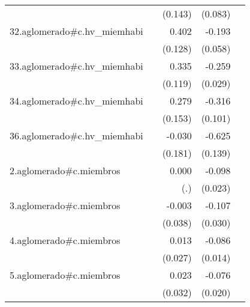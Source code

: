 {\begin{longtable}{l*{4}{D{.}{.}{-1}}}
            &                     &     (0.143)         &     (0.083)         &                     \\
\addlinespace
32.aglomerado#c.hv\_miemhabi&                     &       0.402\sym{**} &      -0.193\sym{***}&                     \\
            &                     &     (0.128)         &     (0.058)         &                     \\
\addlinespace
33.aglomerado#c.hv\_miemhabi&                     &       0.335\sym{**} &      -0.259\sym{***}&                     \\
            &                     &     (0.119)         &     (0.029)         &                     \\
\addlinespace
34.aglomerado#c.hv\_miemhabi&                     &       0.279         &      -0.316\sym{**} &                     \\
            &                     &     (0.153)         &     (0.101)         &                     \\
\addlinespace
36.aglomerado#c.hv\_miemhabi&                     &      -0.030         &      -0.625\sym{***}&                     \\
            &                     &     (0.181)         &     (0.139)         &                     \\
\addlinespace
2.aglomerado#c.miembros&                     &       0.000         &      -0.098\sym{***}&                     \\
            &                     &         (.)         &     (0.023)         &                     \\
\addlinespace
3.aglomerado#c.miembros&                     &      -0.003         &      -0.107\sym{***}&                     \\
            &                     &     (0.038)         &     (0.030)         &                     \\
\addlinespace
4.aglomerado#c.miembros&                     &       0.013         &      -0.086\sym{***}&                     \\
            &                     &     (0.027)         &     (0.014)         &                     \\
\addlinespace
5.aglomerado#c.miembros&                     &       0.023         &      -0.076\sym{***}&                     \\
            &                     &     (0.032)         &     (0.020)         &                     \\

\end{longtable}}
